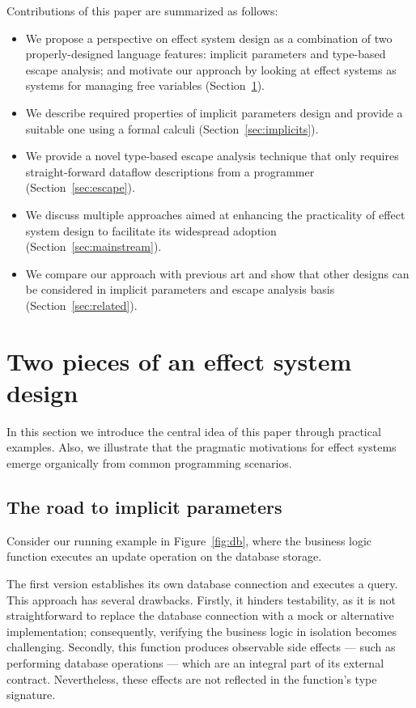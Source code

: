 \documentclass[acmsmall,review,screen]{acmart}
\begin{document}
Contributions of this paper are summarized as follows:
\begin{itemize}
    \item We propose a perspective on effect system design as a combination of two properly-designed language features: implicit parameters and type-based escape analysis; and motivate our approach by looking at effect systems as systems for managing free variables (Section~\ref{sec:idea}).
    \item We describe required properties of implicit parameters design and provide a suitable one using a formal calculi (Section~\ref{sec:implicits}).
    \item We provide a novel type-based escape analysis technique that only requires straight-forward dataflow descriptions from a programmer (Section~\ref{sec:escape}).
    \item We discuss multiple approaches aimed at enhancing the practicality of effect system design to facilitate its widespread adoption (Section~\ref{sec:mainstream}).
    \item We compare our approach with previous art and show that other designs can be considered in implicit parameters and escape analysis basis (Section~\ref{sec:related}).
\end{itemize}


\section{Two pieces of an effect system design} \label{sec:idea}

In this section we introduce the central idea of this paper through practical examples.
Also, we illustrate that the pragmatic motivations for effect systems emerge organically from common programming scenarios.

\subsection{The road to implicit parameters} \label{subsec:implicits}

Consider our running example in Figure~\ref{fig:db}, where the business logic function executes an update operation on the database storage.

The first version establishes its own database connection and executes a query.
This approach has several drawbacks.
Firstly, it hinders testability, as it is not straightforward to replace the database connection with a mock or alternative implementation; consequently, verifying the business logic in isolation becomes challenging.
Secondly, this function produces observable side effects --- such as performing database operations --- which are an integral part of its external contract.
Nevertheless, these effects are not reflected in the function’s type signature.
\end{document}
